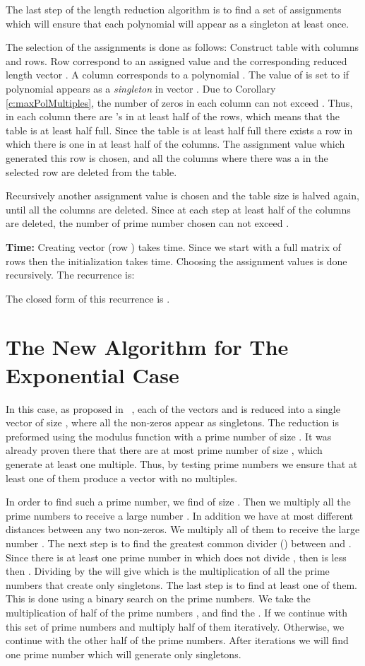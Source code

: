 \documentclass[11pt,amssymb]{article}
\begin{document}
The last step of the length reduction algorithm is to find a set of
 assignments which will ensure that each polynomial will
appear as a singleton at least once.

The selection of the  assignments is done as follows:
Construct table  with  columns and  rows. Row  correspond to an assigned value
 and the corresponding reduced length vector . A
column corresponds to a polynomial . The value of  is set
to  if polynomial  appears as a {\it singleton} in vector
. Due to Corollary \ref{c:maxPolMultiples}, the number of
zeros in each column can not exceed . Thus,
in each column there are 's in at least half of the rows, which
means that the table is at least half full. Since the table is at
least half full there exists a row in which there is one in at least
half of the columns. The assignment value which generated this row
is chosen, and all the columns where there was a  in the selected
row are deleted from the table.

Recursively another assignment value is chosen and the table size is
halved again, until all the columns are deleted. Since at each step
at least half of the columns are deleted, the number of prime number
chosen can not exceed  .

{\bf Time:} Creating vector  (row ) takes  time.
Since we start with a full matrix of  rows then the
initialization takes  time. Choosing the 
assignment values is done recursively. The recurrence is:

The closed form of this recurrence is .




\section{The New Algorithm for The Exponential Case}\label{s:Exp}

In this case, as proposed in ~\cite{LR07}, each of the vectors 
and  is reduced into a single vector of size , where
all the non-zeros appear as singletons. The reduction is preformed
using the modulus function with a prime number  of size
. It was already proven there that there are at most
 prime number of size , which generate at least one
multiple. Thus, by testing  prime numbers we ensure that at
least one of them produce a vector with no multiples.

In order to find such a prime number, we find  of size
. Then we multiply all the prime numbers to receive a
large number . In addition we have at most  different
distances between any two non-zeros. We multiply all of them to
receive the large number . The next step is to find the greatest
common divider () between  and . Since there is at least
one prime number in  which does not divide , then 
is less then . Dividing  by the  will give  which
is the multiplication of all the prime numbers that create only
singletons. The last step is to find at least one of them. This is
done using a binary search on the prime numbers. We take the
multiplication of half of the prime numbers , and find the
. If  we continue with this set of prime
numbers and multiply half of them iteratively. Otherwise, we
continue with the other half of the prime numbers. After  iterations we will find one prime number which will generate
only singletons.
\end{document}
